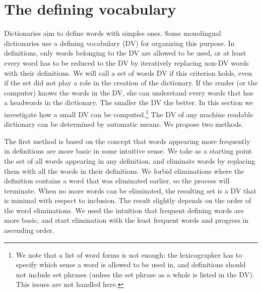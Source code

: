 \documentclass[a4paper,10pt]{article}
\begin{document}
\section{The defining vocabulary}\label{sec_dv}%
Dictionaries aim to define words with simples ones. Some monolingual dictionaries use a defining vocabulary (DV) for organizing this purpose. In definitions, only words belonging to the DV are allowed to be used, or at least every word has to be reduced to the DV by iteratively replacing non-DV words with their definitions. We will call a set of words DV if this criterion holds, even if the set did not play a role in the creation of the dictionary. If the reader (or the computer) knows the words in the DV, she can understand every words that has a headwords in the dictionary. The smaller the DV the better. In this section we investigate how a small DV can be computed.\footnote{We note that a list of word forms is not enough: the lexicographer has to specify which sense a word is allowed to be used in, and definitions should not include set phrases (unless the set phrase as a whole is listed in the DV). This issues are not handled here.} The DV of any machine readable dictionary can be determined by automatic means. We propose two methods.

The first method is based on the concept that words appearing more frequently in definitions are more basic in some intuitive sense. We take as a starting point the set of all words appearing in any definition, and eliminate words by replacing them with all the words in their definitions. We forbid eliminations where the definition contains a word that was eliminated earlier, so the process will terminate. When no more words can be eliminated, the resulting set is a DV that is minimal with respect to inclusion. The result slightly depends on the order of the word eliminations. We used the intuition that frequent defining words are more basic, and start elimination with the least frequent words and progress in ascending order.
\end{document}
